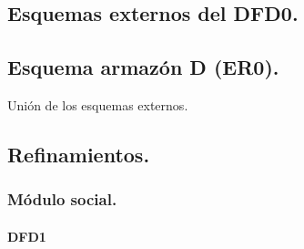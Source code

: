 \documentclass[12pt,a4paper]{article}
\begin{document}
\subsection{Esquemas externos del DFD0.}
\subsection{Esquema armazón D (ER0).}
	Unión de los esquemas externos.
\subsection{Refinamientos.}
\subsubsection{Módulo social.}
\paragraph{DFD1}
\begin{center}
\end{center}	
\end{document}
